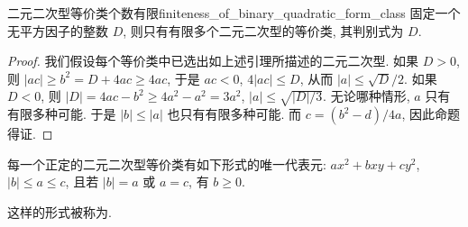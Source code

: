 \begin{theorem}{二元二次型等价类个数有限}{finiteness_of_binary_quadratic_form_class}
固定一个无平方因子的整数 $D$, 则只有有限多个二元二次型的等价类, 其判别式为 $D$.
\end{theorem}
\begin{proof}
我们假设每个等价类中已选出如上述引理所描述的二元二次型. 如果 $D>0$, 则 $|ac|\ge b^2=D+4ac\ge 4ac$, 于是 $ac<0$, $4|ac|\le D$, 从而 $|a|\le\sqrt{D}/2$. 如果 $D<0$, 则 $|D|=4ac-b^2\ge 4a^2-a^2=3a^2$, $|a|\le\sqrt{|D|/3}$.
无论哪种情形, $a$ 只有有限多种可能. 于是 $|b|\le|a|$ 也只有有限多种可能. 而 $c=(b^2-d)/4a$, 因此命题得证.
\end{proof}

\begin{theorem}{}{}
每一个正定的二元二次型等价类有如下形式的唯一代表元: $ax^2+bxy+cy^2$, $|b|\le a\le c$, 且若 $|b|=a$ 或 $a=c$, 有 $b\ge 0$.
\end{theorem}
\begin{remark}
这样的形式被称为.
\end{remark}

